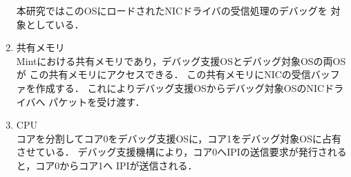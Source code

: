 \documentclass[tanilab-enum]{graduate}
\begin{document}
\begin{enumerate}
        本研究ではこのOSにロードされたNICドライバの受信処理のデバッグを
        対象としている．
    \item 共有メモリ\\
        Mintにおける共有メモリであり，デバッグ支援OSとデバッグ対象OSの両OSが
        この共有メモリにアクセスできる．
        この共有メモリにNICの受信バッファを作成する．
        これによりデバッグ支援OSからデバッグ対象OSのNICドライバへ
        パケットを受け渡す．
    \item CPU\\
        コアを分割してコア0をデバッグ支援OSに，コア1をデバッグ対象OSに占有させている．
        デバッグ支援機構により，コア0へIPIの送信要求が発行されると，コア0からコア1へ
        IPIが送信される．
\end{enumerate}

\end{document}
